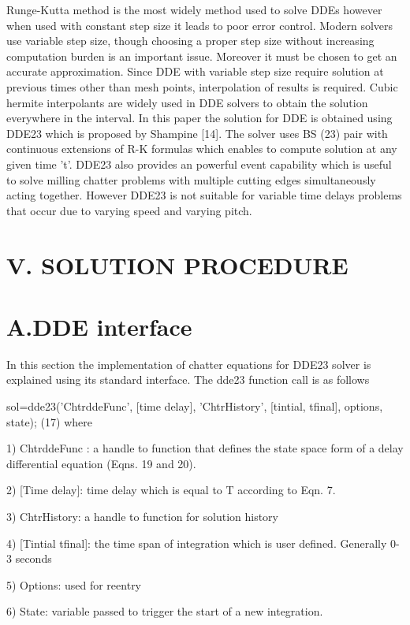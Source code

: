 \documentclass[10pt]{article}
\begin{document}
Runge-Kutta method is the most widely method used to solve DDEs however when used with constant step size it leads to poor error control. Modern solvers use variable step size, though choosing a proper step size without increasing computation burden is an important issue. Moreover it must be chosen to get an accurate approximation. Since DDE with variable step size require solution at previous times other than mesh points, interpolation of results is required. Cubic hermite interpolants are widely used in DDE solvers to obtain the solution everywhere in the interval. In this paper the solution for DDE is obtained using DDE23 which is proposed by Shampine [14]. The solver uses BS (23) pair with continuous extensions of R-K formulas which enables to compute solution at any given time ’t’. DDE23 also provides an powerful event capability which is useful to solve milling chatter problems with multiple cutting edges simultaneously acting together. However DDE23 is not suitable for variable time delays problems that occur due to varying speed and varying pitch.

\section*{V. SOLUTION PROCEDURE}

\section*{A.DDE interface}

In this section the implementation of chatter equations for DDE23 solver is explained using its standard interface. The dde23 function call is as follows

sol=dde23('ChtrddeFunc', [time delay], 'ChtrHistory', [tintial, tfinal], options, state); (17) where

1) ChtrddeFunc : a handle to function that defines the state space form of a delay differential equation (Eqns. 19 and 20).

2) [Time delay]: time delay which is equal to T according to Eqn. 7.

3) ChtrHistory: a handle to function for solution history

4) [Tintial tfinal]: the time span of integration which is user defined. Generally 0-3 seconds

5) Options: used for reentry

6) State: variable passed to trigger the start of a new integration.
\end{document}
